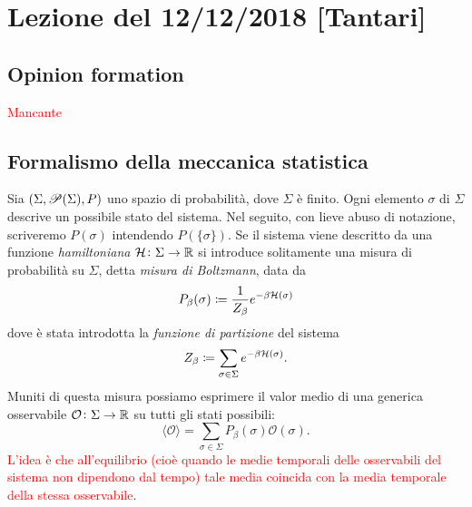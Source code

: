 \section{Lezione del 12/12/2018 [Tantari]}

\subsection{Opinion formation}
\textcolor{red}{Mancante}

\subsection{Formalismo della meccanica statistica}
Sia $ (\Sigma, \P(\Sigma), P) $ uno spazio di probabilità, dove $ \Sigma $ è finito. Ogni elemento $ \sigma $ di $ \Sigma $ descrive un possibile stato del sistema.
Nel seguito, con lieve abuso di notazione, scriveremo $ P(\sigma) $ intendendo $ P(\{\sigma\}) $.
Se il sistema viene descritto da una funzione \emph{hamiltoniana} $ \ham \colon \Sigma\to\R $ si introduce solitamente una misura di probabilità su $ \Sigma $, detta \emph{misura di Boltzmann}, data da
\[ P_\beta(\sigma) \coloneqq \frac{1}{Z_\beta} e^{-\beta\ham(\sigma)} \]
dove è stata introdotta la \emph{funzione di partizione} del sistema
\[ Z_\beta \coloneqq \sum_{\sigma\in\Sigma} e^{-\beta \ham(\sigma)}. \]
Muniti di questa misura possiamo esprimere il valor medio di una generica osservabile $ \mathcal{O}\colon \Sigma\to\R $ su tutti gli stati possibili:
\[ \langle\mathcal{O}\rangle = \sum_{\sigma\in\Sigma} P_\beta(\sigma)\mathcal{O}(\sigma). \]
\textcolor{red}{L'idea è che all'equilibrio (cioè quando le medie temporali delle osservabili del sistema non dipendono dal tempo) tale media coincida con la media temporale della stessa osservabile}.

